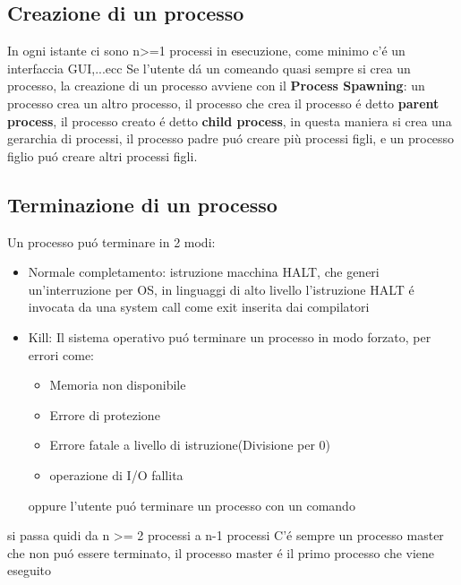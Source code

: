\documentclass[11pt]{article}
\begin{document}
\subsection{Creazione di un processo}
In ogni istante ci sono n>=1 processi in esecuzione, come minimo c'é un interfaccia GUI,...ecc
Se l'utente dá un comeando quasi sempre si crea un processo, la creazione di un processo avviene con il
\textbf{Process Spawning}: un processo crea un altro processo, il processo che crea il processo é detto \textbf{parent process}, il processo creato é detto \textbf{child process},
in questa maniera si crea una gerarchia di processi, il processo padre puó creare più processi figli, e un processo figlio puó creare altri processi figli.
\subsection{Terminazione di un processo}
Un processo puó terminare in 2 modi:
\begin{itemize}
    \item Normale completamento: istruzione macchina HALT, che generi un'interruzione per OS, in linguaggi di alto livello l'istruzione HALT é invocata da una system call come exit inserita dai compilatori
    \item Kill: Il sistema operativo puó terminare un processo in modo forzato, per errori come:
    \begin{itemize}
        \item Memoria non disponibile
        \item Errore di protezione
        \item Errore fatale a livello di istruzione(Divisione per 0)
        \item operazione di I/O fallita
        \end{itemize}
    oppure l'utente puó terminare un processo con un comando
    \end{itemize}
    si passa quidi da n >= 2 processi a n-1 processi
    C'é sempre un processo master che non puó essere terminato, il processo master é il primo processo che viene eseguito
\end{document}
